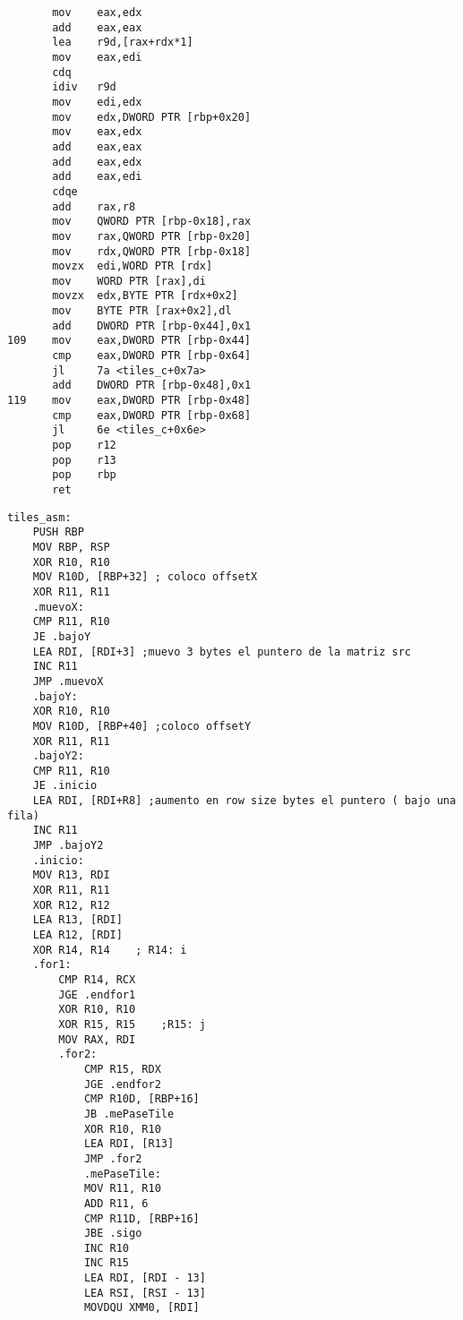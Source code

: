 \begin{codesnippet}
\begin{verbatim}
       mov    eax,edx
       add    eax,eax
       lea    r9d,[rax+rdx*1]
       mov    eax,edi
       cdq    
       idiv   r9d
       mov    edi,edx
       mov    edx,DWORD PTR [rbp+0x20]
       mov    eax,edx
       add    eax,eax
       add    eax,edx
       add    eax,edi
       cdqe   
       add    rax,r8
       mov    QWORD PTR [rbp-0x18],rax
       mov    rax,QWORD PTR [rbp-0x20]
       mov    rdx,QWORD PTR [rbp-0x18]
       movzx  edi,WORD PTR [rdx]
       mov    WORD PTR [rax],di
       movzx  edx,BYTE PTR [rdx+0x2]
       mov    BYTE PTR [rax+0x2],dl
       add    DWORD PTR [rbp-0x44],0x1
109    mov    eax,DWORD PTR [rbp-0x44]
       cmp    eax,DWORD PTR [rbp-0x64]
       jl     7a <tiles_c+0x7a>
       add    DWORD PTR [rbp-0x48],0x1
119    mov    eax,DWORD PTR [rbp-0x48]
       cmp    eax,DWORD PTR [rbp-0x68]
       jl     6e <tiles_c+0x6e>
       pop    r12
       pop    r13
       pop    rbp
       ret   
\end{verbatim}
\end{codesnippet}
\begin{codesnippet}
\begin{verbatim}
tiles_asm:
	PUSH RBP	
	MOV RBP, RSP
	XOR R10, R10
	MOV R10D, [RBP+32] ; coloco offsetX
	XOR R11, R11
	.muevoX:
	CMP R11, R10
	JE .bajoY
	LEA RDI, [RDI+3] ;muevo 3 bytes el puntero de la matriz src
	INC R11
	JMP .muevoX
	.bajoY:
	XOR R10, R10
	MOV R10D, [RBP+40] ;coloco offsetY
	XOR R11, R11
	.bajoY2:
	CMP R11, R10
	JE .inicio
	LEA RDI, [RDI+R8] ;aumento en row size bytes el puntero ( bajo una fila)
	INC R11
	JMP .bajoY2
	.inicio:
	MOV R13, RDI
	XOR R11, R11
	XOR R12, R12
	LEA R13, [RDI]
	LEA R12, [RDI]
	XOR R14, R14	; R14: i
	.for1:
		CMP R14, RCX
		JGE .endfor1
		XOR R10, R10
		XOR R15, R15	;R15: j
		MOV RAX, RDI
		.for2:
			CMP R15, RDX
			JGE .endfor2
			CMP R10D, [RBP+16]
			JB .mePaseTile
			XOR R10, R10
			LEA RDI, [R13]
			JMP .for2
			.mePaseTile:
			MOV R11, R10
			ADD R11, 6
			CMP R11D, [RBP+16]
			JBE .sigo
			INC R10
			INC R15
			LEA RDI, [RDI - 13]
			LEA RSI, [RSI - 13]
			MOVDQU XMM0, [RDI]
\end{verbatim}
\end{codesnippet}
